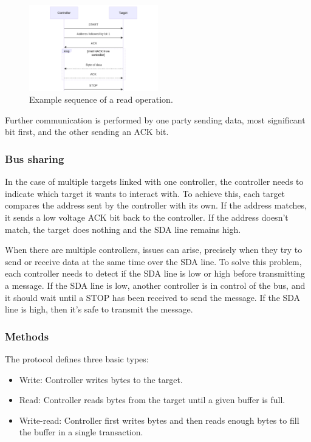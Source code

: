 \begin{figure}[h]
    \centering
    \includegraphics[width=0.5\textwidth]{figures/read_example.png}
    \caption{Example sequence of a read operation.}
    \label{fig:read_example}
\end{figure}

Further communication is performed by one party sending data, most significant bit first, and the other sending an \gls{ACK} bit.

\subsubsection{Bus sharing}

In the case of multiple targets linked with one controller, the controller needs to indicate which target it wants to interact with. To achieve this, each target compares the address sent by the controller with its own. If the address matches, it sends a low voltage \gls{ACK} bit back to the controller. If the address doesn't match, the target does nothing and the \gls{SDA} line remains high.

When there are multiple controllers, issues can arise, precisely when they try to send or receive data at the same time over the \gls{SDA} line. To solve this problem, each controller needs to detect if the \gls{SDA} line is low or high before transmitting a message. If the \gls{SDA} line is low, another controller is in control of the bus, and it should wait until a STOP has been received to send the message. If the \gls{SDA} line is high, then it's safe to transmit the message.

\subsubsection{Methods}

The protocol defines three basic types:
\begin{itemize}
    \item Write: Controller writes bytes to the target.
    \item Read: Controller reads bytes from the target until a given buffer is full.
    \item Write-read: Controller first writes bytes and then reads enough bytes to fill the buffer in a single transaction.
\end{itemize}

